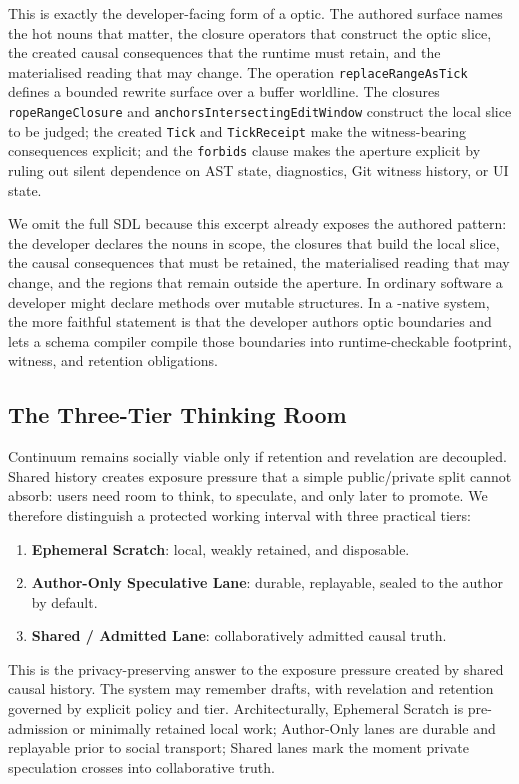 \documentclass{aion}
\begin{document}
This is exactly the developer-facing form of a \WARP{} optic. The authored
surface names the hot nouns that matter, the closure operators that construct
the optic slice, the created causal consequences that the runtime must retain,
and the materialised reading that may change. The operation
\texttt{replaceRangeAsTick} defines a bounded rewrite surface over a buffer
worldline. The closures \texttt{ropeRangeClosure} and
\texttt{anchorsIntersectingEditWindow} construct the local slice to be judged;
the created \texttt{Tick} and \texttt{TickReceipt} make the witness-bearing
consequences explicit; and the \texttt{forbids} clause makes the aperture
explicit by ruling out silent dependence on AST state, diagnostics, Git witness
history, or UI state.

We omit the full SDL because this excerpt already exposes the authored pattern:
the developer declares the nouns in scope, the closures that build the local
slice, the causal consequences that must be retained, the materialised reading
that may change, and the regions that remain outside the aperture. In ordinary
software a developer might declare methods over mutable structures. In a
\WARP{}-native system, the more faithful statement is that the developer authors
optic boundaries and lets a schema compiler compile those boundaries into
runtime-checkable footprint, witness, and retention obligations.

\subsection{The Three-Tier Thinking Room}

Continuum remains socially viable only if retention and revelation are decoupled. Shared history creates exposure pressure that a simple public/private split cannot absorb: users need room to think, to speculate, and only later to promote. We therefore distinguish a protected working interval with three practical tiers:

\begin{enumerate}[leftmargin=*]
	\item \textbf{Ephemeral Scratch}: local, weakly retained, and disposable.
	\item \textbf{Author-Only Speculative Lane}: durable, replayable, sealed to the author by default.
	\item \textbf{Shared / Admitted Lane}: collaboratively admitted causal truth.
\end{enumerate}

This is the privacy-preserving answer to the exposure pressure created by shared
causal history. The system may remember drafts, with revelation and retention
governed by explicit policy and tier. Architecturally, Ephemeral Scratch is
pre-admission or minimally retained local work; Author-Only lanes are durable
and replayable prior to social transport; Shared lanes mark the moment private
speculation crosses into collaborative truth.
\end{document}
